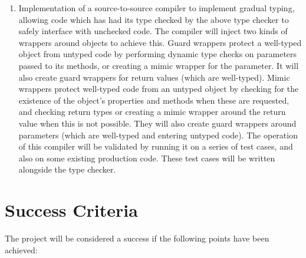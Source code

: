 \documentclass{article}
\begin{document}
\begin{enumerate}
		 \item Implementation of a source-to-source compiler to implement
		   gradual typing, allowing code which has had its type checked by the
		   above type checker to safely interface with unchecked code. The
		   compiler will inject two kinds of wrappers around objects to achieve
		   this. Guard wrappers protect a well-typed object from untyped code
		   by performing dynamic type checks on parameters passed to its
		   methods, or creating a mimic wrapper for the parameter. It will also
		   create guard wrappers for return values (which are well-typed).
		   Mimic wrappers protect well-typed code from an untyped object by
		   checking for the existence of the object's properties and methods
		   when these are requested, and checking return types or creating a
		   mimic wrapper around the return value when this is not possible.
		   They will also create guard wrappers around parameters (which are
		   well-typed and entering untyped code). The operation of this
		   compiler will be validated by running it on a series of test cases,
		   and also on some existing production code. These test cases will be
		   written alongside the type checker.

		\end{enumerate}

	\section{Success Criteria}\label{prop-success-criteria}

		The project will be considered a success if the following points have been achieved:
\end{document}
